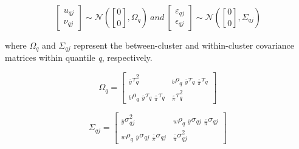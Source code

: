 \[\begin{bmatrix}
u_{qj} \\
\nu_{qj}
\end{bmatrix} \sim \mathcal{N}\left( \genfrac{[}{]}{0pt}{}{0}{0},\Omega_{q} \right)\ and\ \begin{bmatrix}
\varepsilon_{qj} \\
\epsilon_{qj}
\end{bmatrix} \sim \mathcal{N}\left( \genfrac{[}{]}{0pt}{}{0}{0},\Sigma_{qj} \right)\]

where \(\Omega_{q}\) and \(\Sigma_{qj}\) represent the between-cluster and within-cluster covariance matrices within quantile \emph{q}, respectively.

\[\Omega_{q} = \begin{bmatrix}
{}_{\overline{y}}\tau_{q}^{2} & {}_{b}\rho_{q} \; {}_{\overline{y}}\tau_{q} \; {}_{\overline{\widehat{\pi}}}\tau_{q} \\
{}_{b}\rho_{q} \; {}_{\overline{y}}\tau_{q} \; {}_{\overline{\widehat{\pi}}}\tau_{q} & {}_{\overline{\widehat{\pi}}}\tau_{q}^{2}
\end{bmatrix}\]

\[\Sigma_{qj} = \begin{bmatrix}
{}_{\overline{y}}\sigma_{qj}^{2} & {}_{w}\rho_{q} \; {}_{\overline{y}}\sigma_{qj} \; {}_{\overline{\widehat{\pi}}}\sigma_{qj} \\
{}_{w}\rho_{q} \; {}_{\overline{y}}\sigma_{qj} \; {}_{\overline{\widehat{\pi}}}\sigma_{qj} & {}_{\overline{\widehat{\pi}}}\sigma_{qj}^{2}
\end{bmatrix}\]

